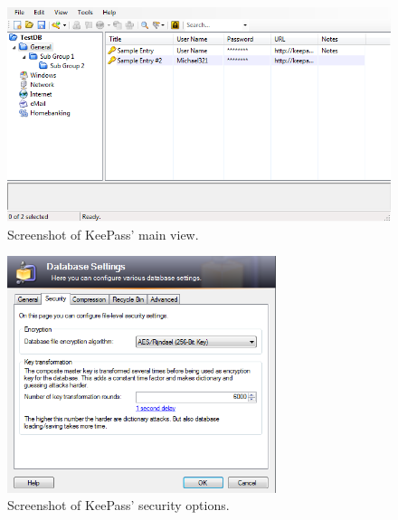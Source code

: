 			\begin{figure}[h!]
				\centering
				\includegraphics[width=\textwidth]{figures/analysis/keepass_mainview.png}
				\caption{Screenshot of KeePass' main view.}
				\label{fig:keepass_main}
			\end{figure}

			\begin{figure}[h!]
				\centering
				\includegraphics[width=0.7\textwidth]{figures/analysis/keepass_create_security.png}
				\caption{Screenshot of KeePass' security options.}
				\label{fig:keepass_create_security}
			\end{figure}
		

